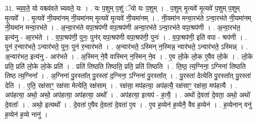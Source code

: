 \documentclass[17pt]{extarticle}
\begin{document}
31. च्य॒व॒ते॒ यो यश्च्य॑वते च्यवते॒ यः । . यः प॒शुम् प॒शुं ॅयो यः प॒शुम् । . प॒शुम् मृ॒त्यवे॑ मृ॒त्यवे॑ प॒शुम् प॒शुम् मृ॒त्यवे᳚ । . मृ॒त्यवे॑ नी॒यमा॑नम् नी॒यमा॑नम् मृ॒त्यवे॑ मृ॒त्यवे॑ नी॒यमा॑नम् । . नी॒यमा॑न मन्वा॒रभ॑ते ऽन्वा॒रभ॑ते नी॒यमा॑नम् नी॒यमा॑न मन्वा॒रभ॑ते । . अ॒न्वा॒रभ॑ते वपा॒श्रप॑णी वपा॒श्रप॑णी अन्वा॒रभ॑ते ऽन्वा॒रभ॑ते वपा॒श्रप॑णी । . अ॒न्वा॒रभ॑त॒ इत्य॑नु - आ॒रभ॑ते । . व॒पा॒श्रप॑णी॒ पुनः॒ पुन॑र् वपा॒श्रप॑णी वपा॒श्रप॑णी॒ पुनः॑ । . व॒पा॒श्रप॑णी॒ इति॑ वपा - श्रप॑णी । . पुन॑ र॒न्वार॑भते॒ ऽन्वार॑भते॒ पुनः॒ पुन॑ र॒न्वार॑भते । . अ॒न्वार॑भते॒ ऽस्मिन् न॒स्मिन्न॒ न्वार॑भते॒ ऽन्वार॑भते॒ ऽस्मिन्न् । . अ॒न्वार॑भत॒ इत्य॑नु - आर॑भते । . अ॒स्मिन् ने॒वै वास्मिन् न॒स्मिन् ने॒व । . ए॒व लो॒के लो॒क ए॒वैव लो॒के । . लो॒के प्रति॒ प्रति॑ लो॒के लो॒के प्रति॑ । . प्रति॑ तिष्ठति तिष्ठति॒ प्रति॒ प्रति॑ तिष्ठति । . ति॒ष्ठ॒ त्य॒ग्निना॒ ऽग्निना॑ तिष्ठति तिष्ठ त्य॒ग्निना᳚ । . अ॒ग्निना॑ पु॒रस्ता᳚त् पु॒रस्ता॑ द॒ग्निना॒ ऽग्निना॑ पु॒रस्ता᳚त् । . पु॒रस्ता॑ देत्येति पु॒रस्ता᳚त् पु॒रस्ता॑ देति । . ए॒ति॒ रक्ष॑साꣳ॒॒ रक्ष॑सा मेत्येति॒ रक्ष॑साम् । . रक्ष॑सा॒ मप॑हत्या॒ अप॑हत्यै॒ रक्ष॑साꣳ॒॒ रक्ष॑सा॒ मप॑हत्यै । . अप॑हत्या॒ अथो॒ अथो॒ अप॑हत्या॒ अप॑हत्या॒ अथो᳚ । . अप॑हत्या॒ इत्यप॑ - ह॒त्यै॒ । . अथो॑ दे॒वता॑ दे॒वता॒ अथो॒ अथो॑ दे॒वताः᳚ । . अथो॒ इत्यथो᳚ । . दे॒वता॑ ए॒वैव दे॒वता॑ दे॒वता॑ ए॒व । . ए॒व ह॒व्येन॑ ह॒व्येनै॒ वैव ह॒व्येन॑ । . ह॒व्येनान् वनु॑ ह॒व्येन॑ ह॒व्ये नानु॑ । \newline
\end{document}
